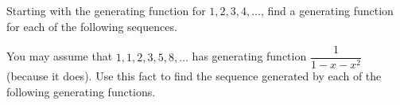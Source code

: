\begin{questions}
\question Starting with the generating function for $1,2,3,4, \ldots$, find a generating function for each of the following sequences.

	\begin{answer}
	\end{answer}






\question You may assume that $1, 1, 2, 3, 5, 8,\ldots$ has generating function $\dfrac{1}{1-x-x^2}$ (because it does).  Use this fact to find the sequence generated by each of the following generating functions.
\begin{parts}

\end{parts}
\end{questions}
